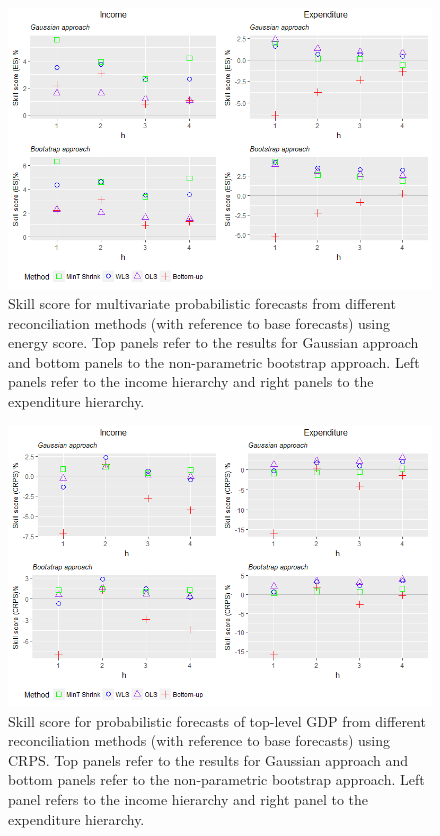 \documentclass[graybox]{svmult}
\begin{document}
\begin{figure}[t]
	\centering
	\small
	\includegraphics[width=\textwidth]{Figs/Results/ProbF_MultivS.png}
	\caption{Skill score for multivariate probabilistic forecasts from different reconciliation methods (with reference to base forecasts) using energy score. Top panels refer to the results for Gaussian approach and bottom panels to the non-parametric bootstrap approach. Left panels refer to the income hierarchy and right panels to the expenditure hierarchy.}
	\label{fig: Prob-forecasts-SS_ES}
\end{figure}

\begin{figure}[t]
	\centering
	\small
	\includegraphics[width=\textwidth]{Figs/Results/ProbF_UnivS.png}
	\caption{Skill score for probabilistic forecasts of top-level GDP from different reconciliation methods (with reference to base forecasts) using CRPS. Top panels refer to the results for Gaussian approach and bottom panels refer to the non-parametric bootstrap approach. Left panel refers to the income hierarchy and right panel to the expenditure hierarchy.}
	\label{fig: Prob-forecasts-SS_CRPS}
\end{figure}
\end{document}
